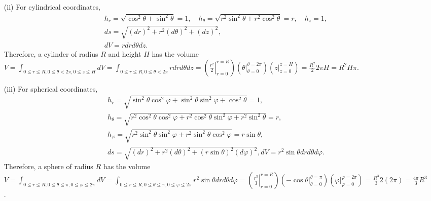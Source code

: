 {\begin{itemize}
\begin{equation}
\begin{split}
=
r(\cos^2 \theta +\sin^2 \theta) = r
dr d \theta
.
\end{split}
\label{2018-mm-ch-exhhpc}
\end{equation}
In the Babylonian spirit it is always prudent to check the validity of the expressions  for some  known instances,
say the circumference
$C=\int_{r=R,0\le \theta <2\pi} ds
=\int_{r=R,0\le \theta <2\pi} \sqrt{ \underbrace{(dr)^2}_{=0}+ r^2 (d \theta )^2}
=  \int_0^{2\pi}R d \theta
= 2\pi R$ of a circle of radius $R$.
The volume of this circle is
$V
=\int_{0\le r\le R,0\le \theta <2\pi} dV
=\int_{0\le r\le R,0\le \theta <2\pi} r dr d\theta =
\left( \left.\frac{r^2}{2}\right|_{r=0}^{r=R}\right)
\left( \left.\theta \right|_{\theta=0}^{\theta=2\pi}\right)
=\frac{R^2}{2} 2\pi = R^2 \pi$.

\item[(ii)]
For cylindrical coordinates,
\begin{equation}
\begin{split}
h_r=\sqrt{ \cos^2\theta + \sin^2 \theta }=1,\quad
h_\theta=\sqrt{ r^2 \sin^2\theta + r^2 \cos^2 \theta }=r, \quad
h_z=1,\\
ds= \sqrt{ (dr)^2+ r^2 (d \theta )^2 + (dz)^2},\\
dV= r dr d\theta dz
.
\end{split}
\label{2018-mm-ch-exhhcyc}
\end{equation}
Therefore, a cylinder of radius $R$ and height $H$ has the volume
$V
=\int_{0\le r\le R,0\le \theta <2\pi,0\le z \le H} dV
=\int_{0\le r\le R,0\le \theta <2\pi} rdr d\theta dz =
\left( \left.\frac{r^2}{2}\right|_{r=0}^{r=R}\right)
\left( \left.\theta \right|_{\theta=0}^{\theta=2\pi}\right)
\left( \left.z\right|_{z=0}^{z=H}\right)
=\frac{R^2}{2} 2\pi H = R^2 H \pi$.

\item[(iii)]
For spherical coordinates,
\begin{equation}
\begin{split}
h_r=\sqrt{ \sin^2\theta \cos^2\varphi + \sin^2 \theta \sin^2\varphi +\cos^2 \theta}=1,\\
h_\theta=\sqrt{ r^2 \cos^2\theta \cos^2 \varphi + r^2 \cos^2 \theta \sin^2 \varphi + r^2 \sin^2 \theta }=r,\\
h_\varphi=\sqrt{ r^2 \sin^2\theta \sin^2 \varphi + r^2 \sin^2 \theta \cos^2 \varphi  }=r\sin \theta,\\
ds= \sqrt{ (dr)^2+ r^2 (d \theta )^2 + (r \sin \theta)^2 (d\varphi )^2},
dV= r^2 \sin \theta dr d\theta d\varphi
.
\end{split}
\label{2018-mm-ch-exhhspher}
\end{equation}
Therefore, a sphere of radius $R$  has the volume
$V
=\int_{0\le r\le R,0\le \theta \le \pi,0\le \varphi \le 2\pi} dV
=\int_{0\le r\le R,0\le \theta \le \pi,0\le \varphi \le 2\pi} r^2 \sin \theta dr d\theta d\varphi
=
\left( \left.\frac{r^3}{3}\right|_{r=0}^{r=R}\right)
\left( \left.-\cos \theta \right|_{\theta=0}^{\theta=\pi}\right)
\left( \left.\varphi \right|_{\varphi =0}^{\varphi =2\pi}\right)
=\frac{R^3}{3} 2 (2\pi) = \frac{4 \pi}{3}  R^3$.
\end{itemize}
\eexample
}

